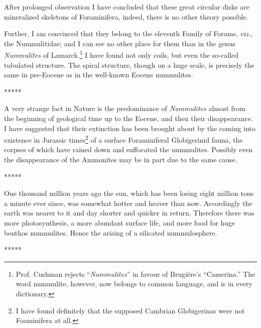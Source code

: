 \documentclass[a4paper, 12pt, oneside]{article}
\begin{document}
After prolonged observation I have concluded that these great circular disks are mineralized skeletons of Foraminifera, indeed, there is no other theory possible.

Further, I am convinced that they belong to the eleventh Family of Forams, \emph{viz.}, the Nummulitidae; and I can see no other place for them than in the genus \emph{Nummulites} of Lamarck.\footnote{Prof. Cushman rejects ``\emph{Nummulites}'' in favour of Brugiére's ``Camerina.'' The word nummulite, however, now belongs to common language, and is in every dictionary.} I have found not only coils, but even the so-called tubulated structure. The spiral structure, though on a huge scale, is precisely the same in pre-Eocene as in the well-known Eocene nummulites.

\centerline{*\hspace{15mm}*\hspace{15mm}*\hspace{15mm}*\hspace{15mm}*}
\bigskip

A very strange fact in Nature is the predominance of \emph{Nummulites} almost from the beginning of geological time up to the Eocene, and then their disappearance. I have suggested that their extinction has been brought about by the coming into existence in Jurassic times\footnote{I have found definitely that the supposed Cambrian Globigerinas were not Foaminifera at all.} of a surface Foraminiferal Globigerinid fauna, the corpses of which have rained down and suffocated the nummulites. Possibly even the disappearance of the Ammonites may be in part due to the same cause.

\centerline{*\hspace{15mm}*\hspace{15mm}*\hspace{15mm}*\hspace{15mm}*}
\bigskip

One thousand million years ago the sun, which has been losing eight million tons a minute ever since, was somewhat hotter and heaver than now. Accordingly the earth was nearer to it and day shorter and quicker in return. Therefore there was more photosynthesis, a more abundant surface life, and more food for huge benthos nummulites. Hence the arising of a silicated nummulosphere.

\centerline{*\hspace{15mm}*\hspace{15mm}*\hspace{15mm}*\hspace{15mm}*}
\bigskip
\end{document}
